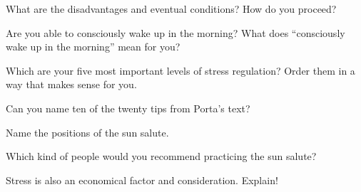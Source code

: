 \documentclass[../main.tex]{subfiles}
\begin{document}
    What are the disadvantages and eventual conditions? How do you proceed?
  \item Are you able to consciously wake up in the morning? What does ``consciously wake up in the morning'' mean for you?
    \vspace{4mm}
  \item Which are your five most important levels of stress regulation? Order them in a way that makes sense for you.
  \item Can you name ten of the twenty tips from Porta's text?
    \vspace{4mm}
  \item Name the positions of the sun salute.
  \item Which kind of people would you recommend practicing the sun salute?
    \vspace{4mm}
    \item Stress is also an economical factor and consideration. Explain!
\end{document}
